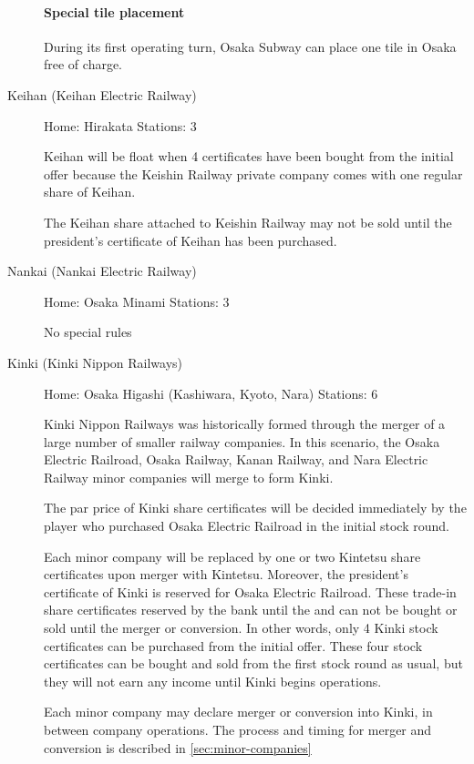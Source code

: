 \documentclass{article}
\begin{document}
\begin{CJK}{UTF8}{min}
\begin{multicols}{2}
\begin{description}
\paragraph{Special tile placement}
During its first operating turn, Osaka Subway can place one tile in
Osaka free of charge.

\item[Keihan (Keihan Electric Railway)] \hfill

Home: Hirakata \hfill Stations: 3

Keihan will be float when 4 certificates have been bought from the initial offer because the Keishin Railway private company comes with one regular share of Keihan.

The Keihan share attached to Keishin Railway may not be sold until the
president's certificate of Keihan has been purchased.

\item[Nankai (Nankai Electric Railway)] \hfill

Home: Osaka Minami \hfill Stations: 3

No special rules

\item[Kinki (Kinki Nippon Railways)] \hfill
\label{kinki}

Home: Osaka Higashi (Kashiwara, Kyoto, Nara) \hfill Stations: 6

Kinki Nippon Railways was historically formed through the merger of a
large number of smaller railway companies. In this scenario, the Osaka
Electric Railroad, Osaka Railway, Kanan Railway, and Nara Electric
Railway minor companies will merge to form Kinki.

The par price of Kinki share certificates will be decided immediately
by the player who purchased Osaka Electric Railroad in the initial
stock round.

Each minor company will be replaced by one or two Kintetsu share
certificates upon merger with Kintetsu. Moreover, the president's
certificate of Kinki is reserved for Osaka Electric Railroad. These
trade-in share certificates reserved by the bank until the and can not
be bought or sold until the merger or conversion. In other words, only
4 Kinki stock certificates can be purchased from the initial
offer. These four stock certificates can be bought and sold from the
first stock round as usual, but they will not earn any income until
Kinki begins operations.

Each minor company may declare merger or conversion into Kinki, in
between company operations. The process and timing for merger and
conversion is described in \autoref{sec:minor-companies}


\end{description}
\end{multicols}
\end{CJK}
\end{document}
